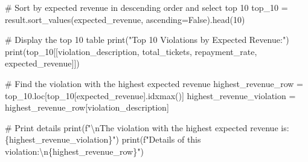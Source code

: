\documentclass[
  letterpaper,
  DIV=11,
  numbers=noendperiod]{scrartcl}
\newenvironment{Shaded}{\begin{snugshade}}{\end{snugshade}}
\newcommand{\BuiltInTok}[1]{\textcolor[rgb]{0.00,0.23,0.31}{#1}}
\newcommand{\CharTok}[1]{\textcolor[rgb]{0.13,0.47,0.30}{#1}}
\newcommand{\CommentTok}[1]{\textcolor[rgb]{0.37,0.37,0.37}{#1}}
\newcommand{\DecValTok}[1]{\textcolor[rgb]{0.68,0.00,0.00}{#1}}
\newcommand{\NormalTok}[1]{\textcolor[rgb]{0.00,0.23,0.31}{#1}}
\newcommand{\OperatorTok}[1]{\textcolor[rgb]{0.37,0.37,0.37}{#1}}
\newcommand{\SpecialCharTok}[1]{\textcolor[rgb]{0.37,0.37,0.37}{#1}}
\newcommand{\SpecialStringTok}[1]{\textcolor[rgb]{0.13,0.47,0.30}{#1}}
\newcommand{\StringTok}[1]{\textcolor[rgb]{0.13,0.47,0.30}{#1}}
\newcommand{\VariableTok}[1]{\textcolor[rgb]{0.07,0.07,0.07}{#1}}
\begin{document}
\begin{Shaded}
\begin{Highlighting}[]
\CommentTok{\# Sort by expected revenue in descending order and select top 10}
\NormalTok{top\_10 }\OperatorTok{=}\NormalTok{ result.sort\_values(}\StringTok{\textquotesingle{}expected\_revenue\textquotesingle{}}\NormalTok{, ascending}\OperatorTok{=}\VariableTok{False}\NormalTok{).head(}\DecValTok{10}\NormalTok{)}

\CommentTok{\# Display the top 10 table}
\BuiltInTok{print}\NormalTok{(}\StringTok{"Top 10 Violations by Expected Revenue:"}\NormalTok{)}
\BuiltInTok{print}\NormalTok{(top\_10[[}\StringTok{\textquotesingle{}violation\_description\textquotesingle{}}\NormalTok{, }\StringTok{\textquotesingle{}total\_tickets\textquotesingle{}}\NormalTok{, }\StringTok{\textquotesingle{}repayment\_rate\textquotesingle{}}\NormalTok{, }\StringTok{\textquotesingle{}expected\_revenue\textquotesingle{}}\NormalTok{]])}

\CommentTok{\# Find the violation with the highest expected revenue}
\NormalTok{highest\_revenue\_row }\OperatorTok{=}\NormalTok{ top\_10.loc[top\_10[}\StringTok{\textquotesingle{}expected\_revenue\textquotesingle{}}\NormalTok{].idxmax()]}
\NormalTok{highest\_revenue\_violation }\OperatorTok{=}\NormalTok{ highest\_revenue\_row[}\StringTok{\textquotesingle{}violation\_description\textquotesingle{}}\NormalTok{]}

\CommentTok{\# Print details}
\BuiltInTok{print}\NormalTok{(}\SpecialStringTok{f"}\CharTok{\textbackslash{}n}\SpecialStringTok{The violation with the highest expected revenue is: }\SpecialCharTok{\{}\NormalTok{highest\_revenue\_violation}\SpecialCharTok{\}}\SpecialStringTok{"}\NormalTok{)}
\BuiltInTok{print}\NormalTok{(}\SpecialStringTok{f"Details of this violation:}\CharTok{\textbackslash{}n}\SpecialCharTok{\{}\NormalTok{highest\_revenue\_row}\SpecialCharTok{\}}\SpecialStringTok{"}\NormalTok{)}
\end{Highlighting}
\end{Shaded}
\end{document}

